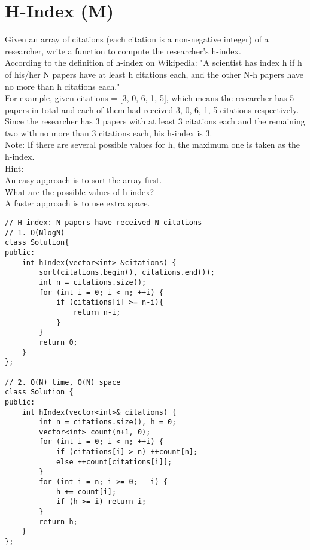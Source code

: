 \section{H-Index (M)}
Given an array of citations (each citation is a non-negative integer) of a researcher, write a function to compute the researcher's h-index.\\

According to the definition of h-index on Wikipedia: "A scientist has index h if h of his/her N papers have at least h citations each, and the other N-h papers have no more than h citations each."\\

For example, given citations = [3, 0, 6, 1, 5], which means the researcher has 5 papers in total and each of them had received 3, 0, 6, 1, 5 citations respectively. Since the researcher has 3 papers with at least 3 citations each and the remaining two with no more than 3 citations each, his h-index is 3.\\

Note: If there are several possible values for h, the maximum one is taken as the h-index.\\

Hint:\\
    An easy approach is to sort the array first.\\
    What are the possible values of h-index?\\
    A faster approach is to use extra space.\\

\begin{lstlisting}
// H-index: N papers have received N citations
// 1. O(NlogN)
class Solution{
public:    
    int hIndex(vector<int> &citations) {
        sort(citations.begin(), citations.end());
        int n = citations.size();
        for (int i = 0; i < n; ++i) {
            if (citations[i] >= n-i){
                return n-i;    
            } 
        }
        return 0;
    }    
};

// 2. O(N) time, O(N) space
class Solution {
public:
    int hIndex(vector<int>& citations) {
        int n = citations.size(), h = 0;
        vector<int> count(n+1, 0);
        for (int i = 0; i < n; ++i) {
            if (citations[i] > n) ++count[n];
            else ++count[citations[i]];
        }
        for (int i = n; i >= 0; --i) {
            h += count[i];
            if (h >= i) return i;
        }
        return h;
    }
};
\end{lstlisting}


